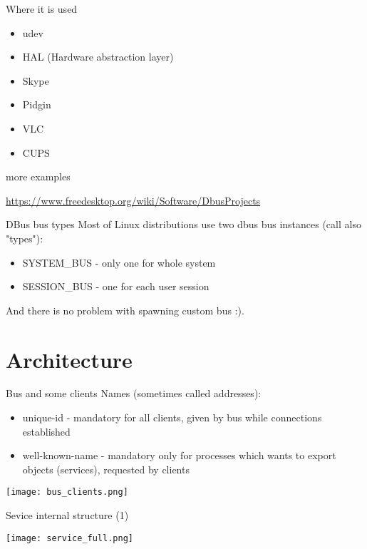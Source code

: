 \documentclass{beamer}
\begin{document}
\begin{frame}{Where it is used}
  \begin{itemize}
    \item udev
    \item HAL (Hardware abstraction layer)
    \item Skype
    \item Pidgin
    \item VLC
    \item CUPS
  \end{itemize}
  \vfill
  \begin{exampleblock}{more examples}
    \begin{small}
      \url{https://www.freedesktop.org/wiki/Software/DbusProjects}
    \end{small}
  \end{exampleblock}
\end{frame}

\begin{frame}{DBus bus types}
Most of Linux distributions use two dbus bus instances (call also "types"):
  \begin{itemize}
    \item SYSTEM\_BUS - only one for whole system
    \item SESSION\_BUS - one for each user session
  \end{itemize}
  And there is no problem with spawning custom bus :).
\end{frame}

\section{Architecture}

\begin{frame}{Bus and some clients}
Names (sometimes called addresses):
  \begin{itemize}
    \item unique-id - mandatory for all clients, given by bus while connections established
    \item well-known-name - mandatory only for processes which wants to export objects (services), requested by clients
  \end{itemize}
  \begin{center}
    \texttt{[image: bus\_clients.png]}
  \end{center}
\end{frame}

\begin{frame}{Sevice internal structure (1)}
  \begin{center}
    \texttt{[image: service\_full.png]}
  \end{center}
\end{frame}
\end{document}

